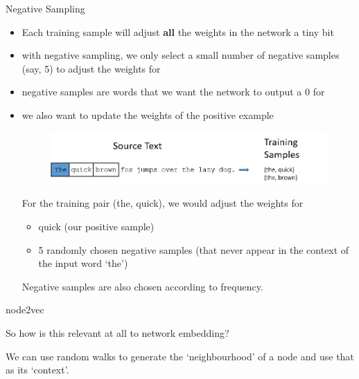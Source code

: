 \documentclass{beamer}
\begin{document}
	
	\begin{frame}[allowframebreaks]{Negative Sampling}
		
		\begin{itemize}
			\item Each training sample will adjust \textbf{all} the weights in the network a tiny bit
			\item with negative sampling, we only select a small number of negative samples (say, 5) to adjust the weights for
			\item negative samples are words that we want the network to output a 0 for
			\item we also want to update the weights of the positive example
			
			\pagebreak
			
			\begin{figure}
				\centering
				\includegraphics[width=\textwidth]{presentation_5_figures/training_data_cut}
			\end{figure}
			
			For the training pair (the, quick), we would adjust the weights for 
			\begin{itemize}
				\item quick (our positive sample)
				\item 5 randomly chosen negative samples (that never appear in the context of the input word `the')
			\end{itemize}

			Negative samples are also chosen according to frequency.
		\end{itemize}
		
		
	\end{frame}
	
	\begin{frame}[allowframebreaks]{node2vec}
		
		So how is this relevant at all to network embedding?
		
		\pagebreak
		
		We can use random walks to generate the `neighbourhood' of a node and use that as its `context'.
		
	\end{frame}
	
\end{document}
